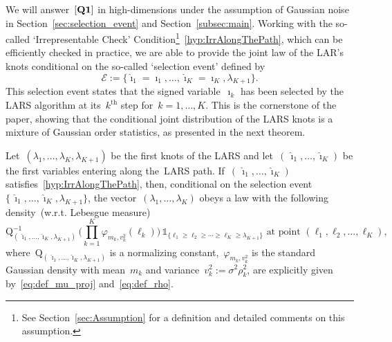 \documentclass[final,numbib]{imaiai}%
\numberwithin{equation}{section}
\renewcommand{\hat}{\widehat}
\newcommand{\<}{\langle}
\renewcommand{\>}{\rangle}
\newcommand{\1}{\mathds{1}}
\begin{document}
{We will answer~$\bf{[Q1]}$ in high-dimensions under the assumption of Gaussian noise in Section~\ref{sec:selection_event} and Section~\ref{subsec:main}.
Working with the so-called `Irrepresentable Check' Condition\footnote{See Section~\ref{sec:Assumption} for a definition and detailed comments on this assumption.}~\eqref{hyp:IrrAlongThePath}, which can be efficiently checked in practice, we are able to provide the joint law of the LAR's knots conditional on the so-called `selection event' defined by
 \[
 \mathcal E:=\big\{\hat \imath_1 =\imath_1, \ldots, \hat \imath_{K}=\imath_{K},\lambda_{K+1}\big\}.
 \]
 This selection event states that the signed variable~$\imath_k$ has been selected by the LARS algorithm at its~$k^{\text{th}}$ step for~$k=1,\ldots,K$.
This is the cornerstone of the paper, showing that the conditional joint distribution of the LARS knots is a mixture of Gaussian order statistics, as presented in the next theorem.
 
 \pagebreak 
 
 \begin{theorem}
\label{thm:Main1}
Let~$(\lambda_1,\ldots, \lambda_K,\lambda_{K+1})$ be the first knots of the LARS and let~$(\,\hat \imath_1,\ldots, \hat \imath_K)$ be the first variables entering along the~LARS path.
If~$(\,\hat \imath_1,\ldots, \hat \imath_K)$ satisfies~\eqref{hyp:IrrAlongThePath}, then, conditional on the selection event~$\{\,\hat \imath_1,\ldots, \hat \imath_K,\lambda_{K+1}\}$, the vector~$(\lambda_{1},\ldots,\lambda_K)$ obeys a law with the following density~(w.r.t. Lebesgue measure) 
\[
{\mathrm Q}^{-1}_{(\,\hat \imath_1,\ldots,\hat \imath_K,\lambda_{K+1})}
\,
\Big(
\prod_{k=1}^K \varphi_{m_k,v_k^2}(\ell_k)
\Big)
\,
\mathds{1}_{\{\ell_1\geq \ell_{2}\geq\cdots\geq\ell_{K}\geq\lambda_{K+1}\}}\text{ at point }(\ell_1, \ell_{2},\ldots,\ell_{K}),
\]
where~${\mathrm Q}_{(\,\hat \imath_1,\ldots,\hat \imath_K,\lambda_{K+1})}$ is a normalizing constant,~$\varphi_{m_k,v_k^2}$ is the standard Gaussian density with mean~$m_k$ and variance~$v_k^2:=\sigma^2\rho_k^2$, are explicitly given by~\eqref{eq:def_mu_proj} and~\eqref{eq:def_rho}.
\end{theorem}

}
\end{document}
